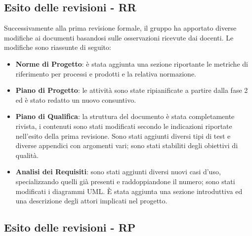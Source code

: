 \subsection{Esito delle revisioni - RR}
Successivamente alla prima revisione formale, il gruppo ha apportato diverse modifiche ai documenti basandosi sulle osservazioni ricevute dai docenti. Le modifiche sono riassunte di seguito:
	\begin{itemize}
		\item \textbf{Norme di Progetto}: è stata aggiunta una sezione riportante le metriche di riferimento per processi e prodotti e la relativa normazione. 
		\item \textbf{Piano di Progetto}: le attività sono state ripianificate a partire dalla fase 2 ed è stato redatto un nuovo consuntivo.
		\item \textbf{Piano di Qualifica}: la struttura del documento è stata completamente rivista, i contenuti sono stati modificati secondo le indicazioni riportate nell'esito della prima revisione. Sono stati aggiunti diversi tipi di test e diverse appendici con argomenti vari; sono stati stabiliti degli obiettivi di qualità.
		\item \textbf{Analisi dei Requisiti}: sono stati aggiunti diversi nuovi casi d'uso, specializzando quelli già presenti e raddoppiandone il numero; sono stati modificati i diagrammi UML. \`E stata aggiunta una sezione introduttiva ed una descrizione degli attori implicati nel progetto. 
	\end{itemize}

\subsection{Esito delle revisioni - RP}	

\newpage
